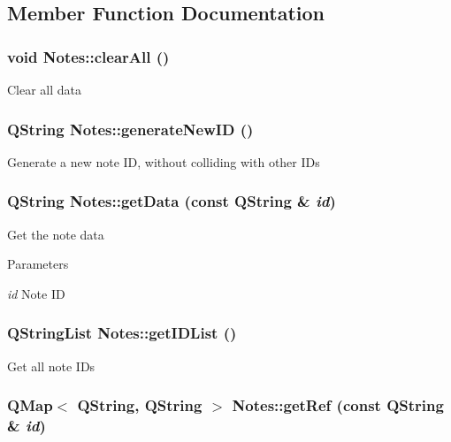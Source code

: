 \subsection{Member Function Documentation}
\hypertarget{classNotes_a9abdabc242dc6340e4b5157fb3620ee0}{
\subsubsection[{clearAll}]{\setlength{\rightskip}{0pt plus 5cm}void Notes::clearAll ()}}
\label{classNotes_a9abdabc242dc6340e4b5157fb3620ee0}
Clear all data \hypertarget{classNotes_ab554798a22ce20a2f7cb195c3b1904bd}{
\subsubsection[{generateNewID}]{\setlength{\rightskip}{0pt plus 5cm}QString Notes::generateNewID ()}}
\label{classNotes_ab554798a22ce20a2f7cb195c3b1904bd}
Generate a new note ID, without colliding with other IDs \hypertarget{classNotes_a3a60de9ba1c1fc3e1cd118ca50443f02}{
\subsubsection[{getData}]{\setlength{\rightskip}{0pt plus 5cm}QString Notes::getData (const QString \& {\em id})}}
\label{classNotes_a3a60de9ba1c1fc3e1cd118ca50443f02}
Get the note data 
\begin{DoxyParams}{Parameters}
\item[{\em id}]Note ID \end{DoxyParams}
\hypertarget{classNotes_aee2eb5a4a6cf347e38351585de15c013}{
\subsubsection[{getIDList}]{\setlength{\rightskip}{0pt plus 5cm}QStringList Notes::getIDList ()}}
\label{classNotes_aee2eb5a4a6cf347e38351585de15c013}
Get all note IDs \hypertarget{classNotes_a2452989d91340c9158210421a5d16362}{
\subsubsection[{getRef}]{\setlength{\rightskip}{0pt plus 5cm}QMap$<$ QString, QString $>$ Notes::getRef (const QString \& {\em id})}}

